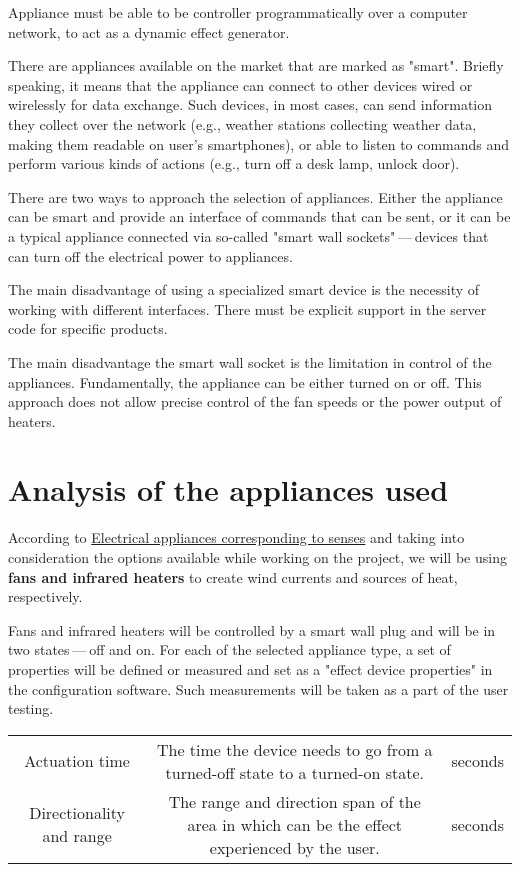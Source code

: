 Appliance must be able to be controller programmatically over a computer network,
to act as a dynamic effect generator.


There are appliances available on the market that are marked as "smart".
Briefly speaking, it means that the appliance
can connect to other devices wired or wirelessly for data exchange. \hyperlink{wisd}{}
Such devices, in most cases, can send information they collect over
the network (e.g., weather stations collecting weather data, making them readable
on user’s smartphones), or able to listen to commands and perform various
kinds of actions (e.g., turn off a desk lamp, unlock door).


There are two ways to approach the selection of appliances. Either the
appliance can be smart and provide an interface of commands that can be sent, or
it can be a typical appliance connected via so-called "smart wall sockets" — devices that can turn off the electrical power to appliances.


The main disadvantage of using a specialized smart device is the necessity of
working with different interfaces. There must be explicit
support in the server code for specific products.


The main disadvantage the smart wall socket is the limitation in
control of the appliances. Fundamentally, the appliance can be either turned on or off.
This approach does not allow precise control of the fan speeds or the power output
of heaters.


\hypertarget{x-analysis-of-the-appliances-used}{\section{Analysis of the appliances used}}
According to \hyperlink{appltable}{Electrical appliances corresponding to senses} and taking into consideration the
options available while working on the project, we will be using \textbf{fans
and infrared heaters}
to create wind currents and sources of heat, respectively.


Fans and infrared heaters will be controlled by a smart wall plug
and will be in two states — off and on. For each of the selected appliance
type, a set of properties will be defined
or measured and set as a "effect device properties" in the configuration
software. Such measurements will be taken as a part of the user testing.


\begin{center}
\begin{tabular}{|c|c|c|}
\hline
Actuation time & The time the device needs to go from a turned-off state to
  a turned-on state. & seconds \\ 
Directionality and range & The range and direction span of the area in
  which can be the effect experienced by the user. & seconds \\ 
\hline
\end{tabular}
\end{center}

